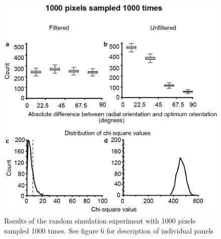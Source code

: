 				\begin{figure}[H]
					
					\includegraphics[width=\linewidth]{rb/FinalFigures/s4.jpg}
					\caption{Results of the random simulation experiment with 1000 pixels sampled 1000 times. See figure 6 for description of individual panels}
					\label{fig:s1000}
				\end{figure}
